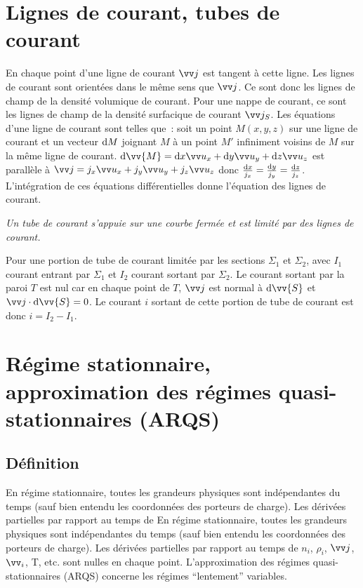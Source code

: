 \section{Lignes de courant, tubes de courant}
\label{chap9-sec:lignesdecourant}

En chaque point d'une ligne de courant $\vj$ est tangent à  cette ligne. Les lignes de courant sont orientées dans le même sens que $\vj$. Ce sont donc les lignes de champ de la densité volumique de courant. Pour une nappe de courant, ce sont les lignes de champ de la densité surfacique de courant $\vj_S$.
Les équations d'une ligne de courant sont telles que~: soit un point $M(x,y,z)$ sur une ligne de courant et un vecteur $\mathrm{d} M$ joignant $M$ à un point $M'$ infiniment voisins de $M$ sur la même ligne de courant.
$\D \vv{M} = \D x \ux + \D y \uy + \D z \uz$ est parallèle à  $\vj = j_x \ux + j_y \uy + j_z \uz$ donc $\frac{\mathrm{d} x}{j_x} = \frac{\mathrm{d} y}{j_y} = \frac{\mathrm{d} z}{j_z}$. L'intégration de ces équations différentielles donne l'équation des lignes de courant.

\emph{Un tube de courant s'appuie sur une courbe fermée et est limité par des lignes de courant.}

Pour une portion de tube de courant limitée par les sections $\Sigma_1$ et $\Sigma_2$, avec $I_1$ courant entrant par $\Sigma_1$ et $I_2$ courant sortant par $\Sigma_2$. Le courant sortant par la paroi $T$ est nul car en chaque point de $T$, $\vj$ est normal à $\D \vv{S}$ et $\vj \cdot \D \vv{S} = 0$. Le courant $i$ sortant de cette portion de tube de courant est donc $i = I_2 - I_1$.

\section{Régime stationnaire, approximation des régimes quasi-stationnaires (ARQS)}
\label{chap9-sec:ARQS}

\subsection{Définition}
\label{chap9-sec:def}

En régime stationnaire, toutes les grandeurs physiques sont indépendantes du temps (sauf bien entendu les coordonnées des porteurs de charge). Les dérivées partielles par rapport au temps de En régime stationnaire, toutes les grandeurs physiques sont indépendantes du temps (sauf bien entendu les coordonnées des porteurs de charge).
Les dérivées partielles par rapport au temps de $n_i$, $\rho_i$, $\vj$, $\vv_i$, T, etc. sont nulles en chaque point. L'approximation des régimes quasi-stationnaires (ARQS) concerne les régimes ``lentement'' variables. 

